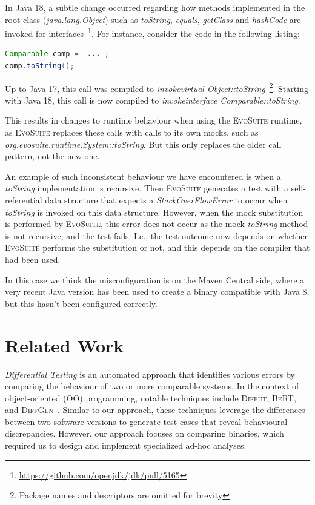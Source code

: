 \documentclass[conference]{IEEEtran}
\makeatletter
\newcommand{\evosuite}{\textsc{EvoSuite}\@\xspace}
\makeatother
\begin{document}
In Java 18, a subtle change occurred regarding how methods implemented in the root class (\textit{java.lang.Object}) such as \textit{toString}, \textit{equals}, \textit{getClass} and \textit{hashCode} are invoked for interfaces~\footnote{\url{https://github.com/openjdk/jdk/pull/5165}}.
For instance, consider the code in the following listing:

\begin{lstlisting}[language=Java]
Comparable comp =  ... ; 
comp.toString();
\end{lstlisting}	

Up to Java 17, this call was compiled to \textit{invokevirtual Object::toString}~\footnote{Package names and descriptors are omitted for brevity}. Starting with Java 18, this call is now compiled to \textit{invokeinterface Comparable::toString}.

This results in changes to runtime behaviour when using the \evosuite runtime, as \evosuite replaces these calls with calls to its own mocks, such as  \textit{org.evosuite.runtime.System::toString}. But this only replaces the older call pattern, not the new one. 

An example of such inconsistent behaviour we have encountered  is when a \textit{toString} implementation is recursive. Then \evosuite generates a test with a self-referential data structure that expects a \textit{StackOverFlowError} to occur when \textit{toString} is invoked on this data structure. However, when the mock substitution is performed by \evosuite, this error does not occur as the mock \textit{toString} method is not recursive, and the test fails. I.e., the test outcome now depends on whether \evosuite performs the substitution or not, and this depends on the compiler that had been used.

In this case we think the misconfiguration is on the Maven Central side, where a very recent Java version has been used to create a binary compatible with Java 8, but this hasn't been configured correctly.





\section{Related Work}
\label{sec:relatedwork}

\emph{Differential Testing}\cite{difftesting} is an automated approach that identifies various errors by comparing the behaviour of two or more comparable systems\cite{xie2007towards,jin10:automated,diffgen}. In the context of object-oriented (OO) programming, notable techniques include \textsc{Diffut}\cite{xie2007towards}, \textsc{BeRT}\cite{jin10:automated}, and \textsc{DiffGen}~\cite{diffgen}. Similar to our approach, these techniques leverage the differences between two software versions to generate test cases that reveal behavioural discrepancies. However, our approach focuses on comparing binaries, which required us to design and implement specialized ad-hoc analyses.
\end{document}
